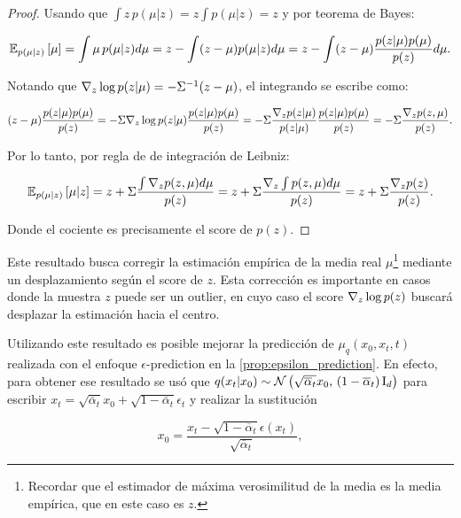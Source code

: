 \begin{proof}
    Usando que $\int z\,p(\mu|z) = z\int p(\mu|z)=z$ y por teorema de Bayes:

    \begin{equation*}
        \mathbb{E}_{p(\mu|z)}\left[\mu\right] = \int \mu\, p(\mu|z)d\mu = z - \int (z-\mu)p(\mu|z) d\mu = z - \int (z-\mu)\frac{p(z|\mu)p(\mu)}{p(z)} d\mu .
    \end{equation*}

    Notando que $\nabla_{z} \log p(z|\mu) = -\Sigma^{-1} (z-\mu)$, el integrando se escribe como:

    \begin{equation*}
        (z-\mu)\frac{p(z|\mu)p(\mu)}{p(z)} = -\Sigma \nabla_{z} \log p(z|\mu) \frac{p(z|\mu)p(\mu)}{p(z)} = -\Sigma \frac{\nabla_z p(z|\mu)}{p(z|\mu)} \frac{p(z|\mu)p(\mu)}{p(z)} = -\Sigma \frac{\nabla_z p(z,\mu)}{p(z)} .
    \end{equation*}

    Por lo tanto, por regla de de integración de Leibniz:

    \begin{equation*}
        \mathbb{E}_{p(\mu|z)}\left[\mu|z\right] = z + \Sigma \frac{\int \nabla_z p(z,\mu)d\mu}{p(z)} = z + \Sigma \frac{\nabla_z \int p(z,\mu)d\mu}{p(z)} = z + \Sigma \frac{\nabla_z p(z)}{p(z)} .
    \end{equation*}

    Donde el cociente es precisamente el score de $p(z)$.
\end{proof}

Este resultado busca corregir la estimación empírica de la media real $\mu$\footnote{Recordar que el estimador de máxima verosimilitud de la media es la media empírica, que en este caso es $z$.} mediante un desplazamiento según el score de $z$. Esta corrección es importante en casos donde la muestra $z$ puede ser un outlier, en cuyo caso el score $\nabla_{z} \log p(z)$ buscará desplazar la estimación hacia el centro.

Utilizando este resultado es posible mejorar la predicción de $\mu_q(x_0,x_t,t)$ realizada con el enfoque $\epsilon$-prediction en la \autoref{prop:epsilon_prediction}. En efecto, para obtener ese resultado se usó que $q(x_t|x_0)\sim\mathcal{N}\left(\sqrt{\overline{\alpha}_t}x_0,\,(1-\overline{\alpha}_t)\operatorname{I}_{d}\right)$ para escribir $x_t=\sqrt{\bar\alpha_t} x_0 + \sqrt{1-\bar\alpha_t} \epsilon_t$ y realizar la sustitución

\begin{equation}
    \label{eq:x0_epsilon_prediction}
    x_0 = \frac{x_t - \sqrt{1-\overline{\alpha}_t}\epsilon(x_t)}{\sqrt{\overline{\alpha}_t}},
\end{equation}

